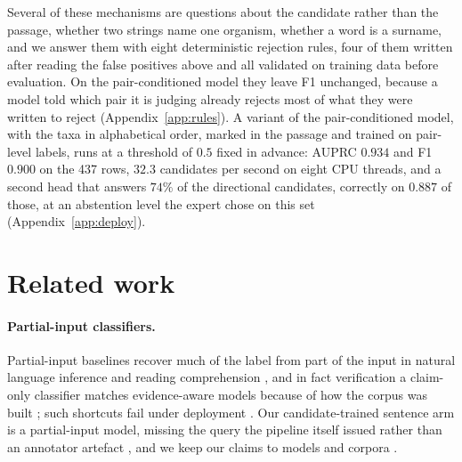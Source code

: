 \documentclass[11pt]{article}
\begin{document}
Several of these mechanisms are questions about the candidate rather than the passage, whether
two strings name one organism, whether a word is a surname, and we answer them with eight
deterministic rejection rules, four of them written after reading the false positives above and
all validated on training data before evaluation. On the pair-conditioned model they leave F1
unchanged, because a model told which pair it is judging already rejects most of what they were
written to reject (Appendix~\ref{app:rules}). A variant of the pair-conditioned model, with the taxa
in alphabetical order, marked in the passage and trained on pair-level labels, runs at a threshold
of $0.5$ fixed in advance: AUPRC $0.934$ and F1 $0.900$ on the 437 rows, $32.3$ candidates per second
on eight CPU threads, and a second head that answers $74\%$ of the directional candidates, correctly
on $0.887$ of those, at an abstention level the expert chose on this set (Appendix~\ref{app:deploy}).

\section{Related work}
\label{sec:related}

\paragraph{Partial-input classifiers.}
Partial-input baselines recover much of the label from part of the input in natural language
inference \citep{gururangan-etal-2018-annotation,poliak-etal-2018-hypothesis} and reading
comprehension \citep{kaushik-lipton-2018-much}, and in fact verification \citep{thorne2018fever} a
claim-only classifier matches evidence-aware models because of how the corpus was built
\citep{schuster-etal-2019-towards}; such shortcuts fail under deployment
\citep{geirhos-etal-2020-shortcut,du-etal-2024-shortcut}. Our candidate-trained sentence arm is a
partial-input model, missing the query the pipeline itself issued rather than an annotator artefact
\citep{wiegand-etal-2019-detection,parmar-etal-2023-dont}, and we keep our claims to models and
corpora \citep{feng-etal-2019-misleading}.
\end{document}
